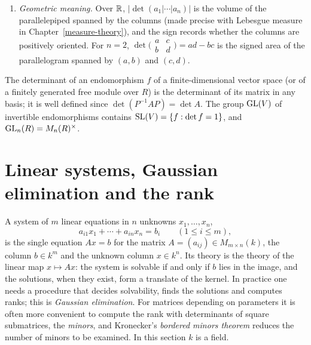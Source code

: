\begin{example}
\begin{enumerate}
$x_2, \ldots, x_n$. Over a field it is nonzero exactly when the $x_i$ are distinct; this is why a polynomial of degree less than $n$ is determined by its values at $n$ distinct points.
\item \emph{Geometric meaning.} Over $\mathbb{R}$, $|\det(a_1 | \cdots | a_n)|$ is the volume of the parallelepiped spanned by the columns (made precise with Lebesgue measure in Chapter~\ref{measure-theory}), and the sign
records whether the columns are positively oriented. For $n = 2$, $\det\bigl(\begin{smallmatrix}a & c\\ b & d\end{smallmatrix}\bigr) = ad - bc$ is the signed area of the parallelogram spanned by $(a, b)$ and
$(c, d)$.
\end{enumerate}
\end{example}

\begin{definition}\label{linear-algebra:definition-determinant-endomorphism}
The determinant of an endomorphism $f$ of a finite-dimensional vector space (or of a finitely
generated free module over $R$) is the determinant of its matrix in any basis; it is well defined
since $\det(P^{-1}AP) = \det A$. The group $\mathrm{GL}(V)$ of invertible endomorphisms contains
$\mathrm{SL}(V) = \{f : \det f = 1\}$, and $\mathrm{GL}_n(R) = M_n(R)^\times$.
\end{definition}

\section{Linear systems, Gaussian elimination and the rank}\label{linear-algebra:section-linear-systems}

A system of $m$ linear equations in $n$ unknowns $x_1, \ldots, x_n$,
\[
a_{i1}x_1 + \cdots + a_{in}x_n = b_i \qquad (1 \leq i \leq m),
\]
is the single equation $Ax = b$ for the matrix $A = (a_{ij}) \in M_{m \times n}(k)$, the column $b \in k^m$ and the unknown column $x \in k^n$. Its theory is the theory of the linear map
$x \mapsto Ax$: the system is solvable if and only if $b$ lies in the image, and the solutions, when they exist, form a translate of the kernel. In practice one needs a procedure that decides
solvability, finds the solutions and computes ranks; this is \emph{Gaussian elimination}. For matrices depending on parameters it is often more convenient to compute the rank with determinants of
square submatrices, the \emph{minors}, and Kronecker's \emph{bordered minors theorem} reduces the number of minors to be examined. In this section $k$ is a field.

